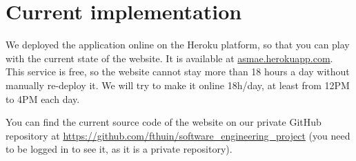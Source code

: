 \section{Current implementation}

We deployed the application online on the Heroku platform, so that you can play with the current state of the website. It is available at \url{asmae.herokuapp.com}. This
service is free, so the website cannot stay more than 18 hours a
day without manually re-deploy it. We will try to make it online 18h/day, at least from 12PM to 4PM each day.\newline

You can find the current source code of the website on our private GitHub
repository at \url{https://github.com/fthuin/software_engineering_project}
(you need to be logged in to see it, as it is a private repository).

